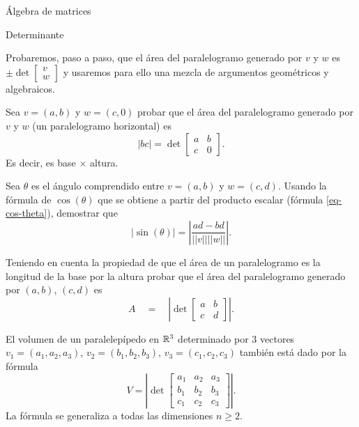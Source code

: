 \begin{chapter}{\'Algebra de matrices}
\begin{section}{Determinante}
\begin{enumex}
    Probaremos, paso a paso, que el área del paralelogramo generado por $v$ y $w$ es $\pm\det\begin{bmatrix} v \\ w \end{bmatrix}$ y usaremos para ello una mezcla de argumentos geométricos y algebraicos. 
    \begin{enumex}
        \item Sea $v = (a,b)$ y $w = (c,0)$ probar que el área del paralelogramo generado por $v$ y $w$ (un paralelogramo horizontal) es 
        $$
        |bc| = \det\begin{bmatrix}
            a&b\\c&0
        \end{bmatrix}. 
        $$
        Es decir,  es base $\times$ altura. 
        \item Sea $\theta$  es el ángulo comprendido entre $v =(a,b)$ y $w = (c,d)$. Usando la fórmula de $\cos(\theta)$  que se obtiene a partir del producto escalar (fórmula \eqref{eq-cos-theta}),  demostrar  que
        $$
        |\sin(\theta)| = \left|\frac{ad-bd}{||v||||w||}\right|.
        $$
        \item Teniendo en cuenta la propiedad de que  el área de un paralelogramo es la longitud de la base por la altura probar que el área del paralelogramo generado por $(a,b)$, $(c,d)$ es
        $$
        A \quad = \quad  \left|\det\begin{bmatrix}
            a&b\\ c&d
        \end{bmatrix}\right|. 
        $$
        \begin{observacion*} El volumen  de un paralelepípedo en $\mathbb R^3$ determinado por $3$ vectores $v_1=(a_1, a_2, a_3)$, $v_2= (b_1, b_2, b_3)$, $v_3= (c_1, c_2, c_3)$ también está dado por la fórmula 
            $$
            V = \left| \det \begin{bmatrix}
                a_1 & a_2 & a_3 \\
                b_1 & b_2 & b_3 \\
                c_1 & c_2 & c_3
        \end{bmatrix} \right|.
            $$
            La fórmula se generaliza a todas las dimensiones $n \ge 2$. 
        \end{observacion*}
    \end{enumex}
\end{enumex}


\end{section}    



\end{chapter}
